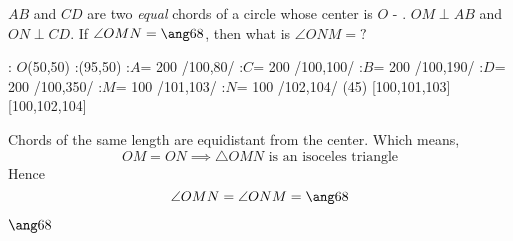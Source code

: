 

\question[1] $AB$ and $CD$ are two \textit{equal} chords of a circle whose center is $O$ - \asif. 
$OM\perp AB$ and $ON\perp CD$. If $\angle OMN = \ang\va$, then what is $\angle ONM = ?$

\watchout

  : $O$(50,50)
  :(95,50) %
  :$A$= 200 /100,80/
  :$C$= 200 /100,100/
  :$B$= 200 /100,190/
  :$D$= 200 /100,350/
  :$M$= 100 /101,103/
  :$N$= 100 /102,104/
\figdrawbegin{}
  (45)
  \figdrawline [101,103] 
  \figdrawline [102,104] 
   [100,101,103]
   [100,102,104]
  \figdrawline [300,301]
\figdrawend
{}

\ifprintanswers
  \begin{marginfigure}
    \centerline{\box\figBoxA}
  \end{marginfigure}
\else
  \vspace{1cm}
  \centerline{\box\figBoxA}
\fi


\begin{solution}[\mcq]
  Chords of the same length are equidistant from the center. Which means, 
   \[ OM = ON \implies \bigtriangleup OMN \text{ is an isoceles triangle} \] 
  Hence
    \[ \angle OMN = \angle ONM = \ang\va \]
\end{solution}

\ifprintanswers\begin{codex}$\ang\va$\end{codex}\fi
